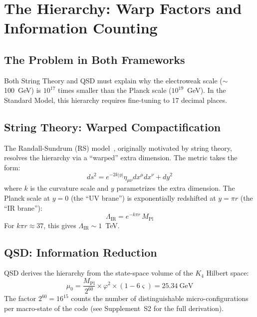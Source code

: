 \documentclass[11pt,a4paper]{article}
\theoremstyle{definition}
\newcommand{\strain}{\varsigma}            %
\newcommand{\gr}{\varphi}
\newcommand{\murad}{\mu_0}
\newcommand{\Mpl}{M_{\mathrm{Pl}}}
\begin{document}
\section{The Hierarchy: Warp Factors and Information Counting}
\label{sec:hierarchy}

\subsection{The Problem in Both Frameworks}

Both String Theory and QSD must explain why the electroweak scale
($\sim$100~GeV) is $10^{17}$ times smaller than the Planck scale
($10^{19}$~GeV).  In the Standard Model, this hierarchy requires
fine-tuning to 17 decimal places.

\subsection{String Theory: Warped Compactification}

The Randall-Sundrum (RS) model~\cite{RandallSundrum1999}, originally motivated by string theory,
resolves the hierarchy via a ``warped'' extra dimension.  The metric
takes the form:
\begin{equation}
ds^2 = e^{-2k|y|}\eta_{\mu\nu}dx^\mu dx^\nu + dy^2
\end{equation}
where $k$ is the curvature scale and $y$ parametrizes the extra dimension.
The Planck scale at $y=0$ (the ``UV brane'') is exponentially redshifted
at $y=\pi r$ (the ``IR brane''):
\begin{equation}
\Lambda_{\text{IR}} = e^{-k\pi r}\,\Mpl
\end{equation}
For $k\pi r \approx 37$, this gives $\Lambda_{\text{IR}} \sim 1$~TeV.

\subsection{QSD: Information Reduction}

QSD derives the hierarchy from the state-space volume of the $K_4$
Hilbert space:
\begin{equation}
\murad = \frac{\Mpl}{2^{60}} \times \gr^2 \times (1 - 6\strain) = 25.34~\text{GeV}
\end{equation}
The factor $2^{60} = 16^{15}$ counts the number of distinguishable
micro-configurations per macro-state of the code (see Supplement~S2 for
the full derivation).
\end{document}
